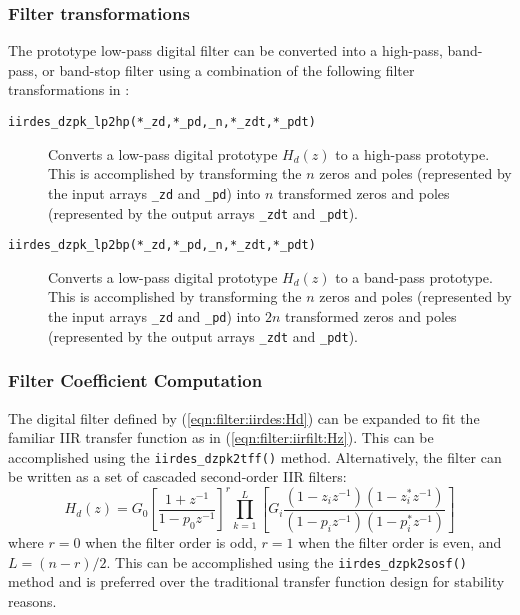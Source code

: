 \subsubsection{Filter transformations}
\label{module:filter:iirdes:transformations}
%
The prototype low-pass digital filter can be converted into a
high-pass, band-pass, or band-stop filter using a combination of the
following filter transformations in \liquid:
%
\begin{description}
\item[{\tt iirdes\_dzpk\_lp2hp(*\_zd,*\_pd,\_n,*\_zdt,*\_pdt)}]
    Converts a low-pass digital prototype $H_d(z)$ to a high-pass
    prototype.
    This is accomplished by transforming the $n$
    zeros and poles
    (represented by the input arrays {\tt \_zd} and {\tt \_pd})
    into $n$ transformed zeros and poles
    (represented by the output arrays {\tt \_zdt} and {\tt \_pdt}).
\item[{\tt iirdes\_dzpk\_lp2bp(*\_zd,*\_pd,\_n,*\_zdt,*\_pdt)}]
    Converts a low-pass digital prototype $H_d(z)$ to a band-pass
    prototype.
    This is accomplished by transforming the $n$
    zeros and poles
    (represented by the input arrays {\tt \_zd} and {\tt \_pd})
    into $2n$ transformed zeros and poles
    (represented by the output arrays {\tt \_zdt} and {\tt \_pdt}).
\end{description}
%

% 
%
\subsubsection{Filter Coefficient Computation}
\label{module:filter:iirdes:coefficients}
%
The digital filter defined by (\ref{eqn:filter:iirdes:Hd}) can be
expanded to fit the familiar IIR transfer function as in
(\ref{eqn:filter:iirfilt:Hz}).
This can be accomplished using the {\tt iirdes\_dzpk2tff()} method.
%
Alternatively, the filter can be written as a set of cascaded
second-order IIR filters:
%
\begin{equation}
\label{eqn:filter:iirfilt:Hd:sos}
    H_d(z) = G_0
             \left[
                \frac{1 + z^{-1}}
                     {1 - p_0 z^{-1}}
             \right]^r
             \prod_{k=1}^{L} {\left[
                G_i \frac{(1-z_iz^{-1})(1-z_i^*z^{-1})}
                         {(1-p_iz^{-1})(1-p_i^*z^{-1})}
             \right]}
\end{equation}
%
where $r=0$ when the filter order is odd, $r=1$ when the filter order is
even, and $L=(n-r)/2$.
This can be accomplished using the {\tt iirdes\_dzpk2sosf()} method and
is preferred over the traditional transfer function design for stability
reasons.

